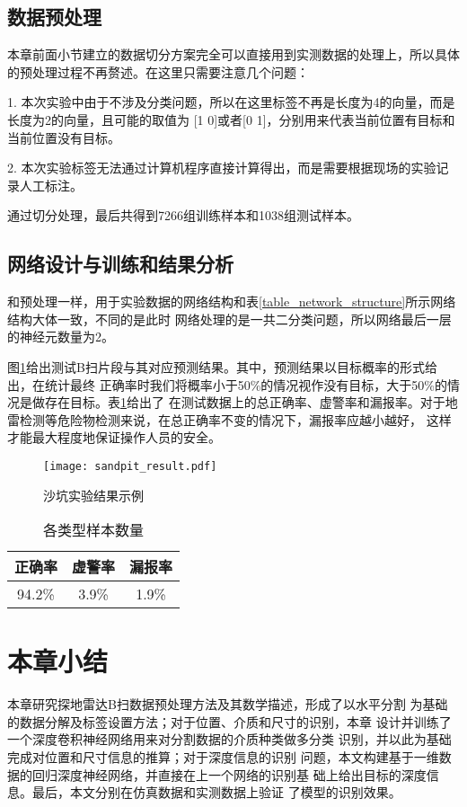 \subsection{数据预处理}
本章前面小节建立的数据切分方案完全可以直接用到实测数据的处理上，所以具体的预处理过程不再赘述。在这里只需要注意几个问题：

1. 本次实验中由于不涉及分类问题，所以在这里标签不再是长度为4的向量，而是长度为2的向量，且可能的取值为
[1 0]或者[0 1]，分别用来代表当前位置有目标和当前位置没有目标。

2. 本次实验标签无法通过计算机程序直接计算得出，而是需要根据现场的实验记录人工标注。

通过切分处理，最后共得到7266组训练样本和1038组测试样本。
\subsection{网络设计与训练和结果分析}
和预处理一样，用于实验数据的网络结构和表\ref{table_network_structure}所示网络结构大体一致，不同的是此时
网络处理的是一共二分类问题，所以网络最后一层的神经元数量为2。

图\ref{sandpit_result}给出测试B扫片段与其对应预测结果。其中，预测结果以目标概率的形式给出，在统计最终
正确率时我们将概率小于50\%的情况视作没有目标，大于50\%的情况是做存在目标。表\ref{table_sanpit_acc}给出了
在测试数据上的总正确率、虚警率和漏报率。对于地雷检测等危险物检测来说，在总正确率不变的情况下，漏报率应越小越好，
这样才能最大程度地保证操作人员的安全。
\begin{figure}[htbp]
	\texttt{[image: sandpit\_result.pdf]}
	\caption[]{沙坑实验结果示例}
	\label{sandpit_result}
\end{figure}

\begin{table}[h]
	\caption{各类型样本数量} 
	\begin{tabular}{|c|c|c|} 
		\hline  
		正确率 & 虚警率 & 漏报率\\
		\hline
		94.2\% & 3.9\% & 1.9\%\\
		\hline
	\end{tabular}
	\label{table_sanpit_acc}
\end{table}
\section{本章小结}
本章研究探地雷达B扫数据预处理方法及其数学描述，形成了以水平分割
为基础的数据分解及标签设置方法；对于位置、介质和尺寸的识别，本章
设计并训练了一个深度卷积神经网络用来对分割数据的介质种类做多分类
识别，并以此为基础完成对位置和尺寸信息的推算；对于深度信息的识别
问题，本文构建基于一维数据的回归深度神经网络，并直接在上一个网络的识别基
础上给出目标的深度信息。最后，本文分别在仿真数据和实测数据上验证
了模型的识别效果。